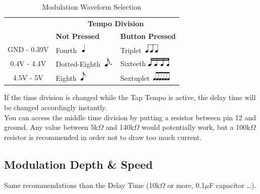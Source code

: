 \documentclass[a4paper, 10pt]{article}
\begin{document}
\begin{table}[h!]
\centering
\begin{tabular}{|c|l|l|}
\hline
\rowcolor{lightgray} & \multicolumn{2}{c|}{{\Large\textbf{Tempo Division}}}\\
\hhline{|>{\arrayrulecolor{lightgray}}->{\arrayrulecolor{black}}|--|}
\rowcolor{lightgray}\multirow{-2}{5cm}{\centering{\Large\textbf{Pin 12 Voltage}}} & {\centering\large\textbf{Not Pressed}} & {\centering\large\textbf{Button Pressed}}\\
\hline
GND - 0.39V & Fourth \hfill \includegraphics[scale=1]{Fourth} & Triplet \hfill \includegraphics[scale=1]{triplet}\\
\hline
0.4V - 4.4V & Dotted-Eighth \hfill \includegraphics[scale=1]{dotted-eight}& Sixteeth \hfill \includegraphics[scale=1]{sixteenth}\\
\hline
4.5V - 5V & Eighth \hfill \includegraphics[scale=1]{eight} & Sextuplet \hfill \includegraphics[scale=1]{sextuplet}\\
\hline
\end{tabular}
\caption{Modulation Waveform Selection}
\end{table}

If the time division is changed while the Tap Tempo is active, the delay time will be changed accordingly instantly.\\

You can access the middle time division by putting a resistor between pin 12 and ground. Any value between 5k$\Omega$ and 140k$\Omega$ would potentially work, but a 100k$\Omega$ resistor is recommended in order not to draw too much current.\\


\subsection{Modulation Depth \& Speed}
\label{subsec:moddepthspeed}
\bigbreak
Same recommendations than the Delay Time (10k$\Omega$ or more, 0.1$\mu$F capacitor …).\\
\end{document}
